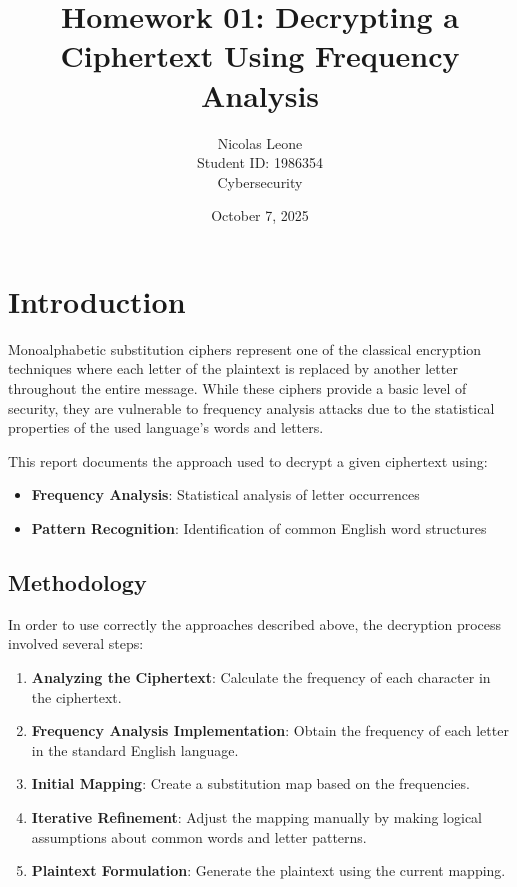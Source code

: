 \documentclass[12pt,a4paper]{article}
\title{Homework 01: Decrypting a Ciphertext Using Frequency Analysis}
\author{Nicolas Leone\\Student ID: 1986354\\Cybersecurity}
\date{October 7, 2025}
\begin{document}
\maketitle

\tableofcontents
\newpage

\section{Introduction}

Monoalphabetic substitution ciphers represent one of the classical encryption techniques where each letter of the plaintext is replaced by another letter throughout the entire message. While these ciphers provide a basic level of security, they are vulnerable to frequency analysis attacks due to the statistical properties of the used language's words and letters.

This report documents the approach used to decrypt a given ciphertext using:
\begin{itemize}
    \item \textbf{Frequency Analysis}: Statistical analysis of letter occurrences
    \item \textbf{Pattern Recognition}: Identification of common English word structures
\end{itemize}

\subsection{Methodology}
In order to use correctly the approaches described above, the decryption process involved several steps:

\begin{enumerate}
    \item \textbf{Analyzing the Ciphertext}: Calculate the frequency of each character in the ciphertext.
    \item \textbf{Frequency Analysis Implementation}: Obtain the frequency of each letter in the standard English language.
    \item \textbf{Initial Mapping}: Create a substitution map based on the frequencies.
    \item \textbf{Iterative Refinement}: Adjust the mapping manually by making logical assumptions about common words and letter patterns.
    \item \textbf{Plaintext Formulation}: Generate the plaintext using the current mapping.
\end{enumerate}
\end{document}
